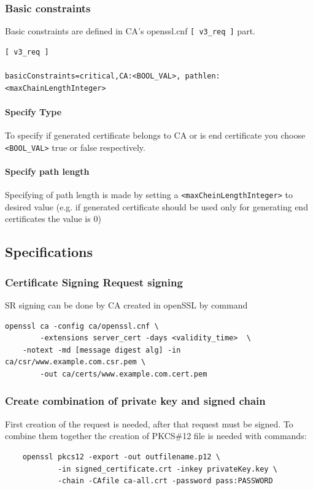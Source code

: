 \documentclass[10pt, a4paper]{report}
\begin{document}
      
    \subsubsection{Basic constraints}
    
    Basic constraints are defined in CA's openssl.cnf \verb+[ v3_req ]+ part.
    \begin{verbatim}
[ v3_req ]

basicConstraints=critical,CA:<BOOL_VAL>, pathlen:<maxChainLengthInteger>
    \end{verbatim}

      \paragraph{Specify Type}
To specify if generated certificate belongs to CA or is end certificate you choose \verb+<BOOL_VAL>+ true or false respectively.
      \paragraph{Specify path length}
Specifying of path length is made by setting a \verb+<maxCheinLengthInteger>+ to desired value (e.g. if generated certificate should be used only for generating end certificates the value is 0)
  \subsection{Specifications}
  
    \subsubsection{Certificate Signing Request signing}
   SR signing can be done by CA created in openSSL by command
\begin{verbatim}
openssl ca -config ca/openssl.cnf \
        -extensions server_cert -days <validity_time>  \
	-notext -md [message digest alg] -in ca/csr/www.example.com.csr.pem \
        -out ca/certs/www.example.com.cert.pem
\end{verbatim}

    \subsubsection{Create combination of private key and signed chain}
    First creation of the request is needed, after that request must be signed. To combine them together the creation of PKCS\#12 file is needed with commands:
\begin{verbatim}
	openssl pkcs12 -export -out outfilename.p12 \
	        -in signed_certificate.crt -inkey privateKey.key \
	        -chain -CAfile ca-all.crt -password pass:PASSWORD
\end{verbatim}
\end{document}
